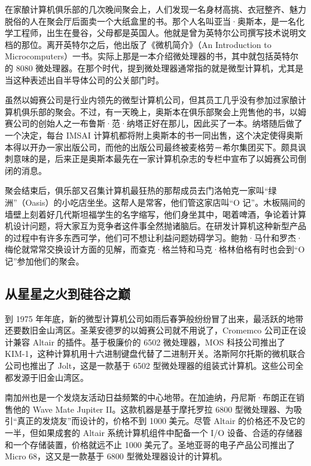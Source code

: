 \documentclass[12pt,UTF8]{ctexbook}
\begin{document}
在家酿计算机俱乐部的几次晚间聚会上，人们发现一名身材高挑、衣冠整齐、魅力脱俗的人在聚会厅后面卖一个大纸盒里的书。那个人名叫亚当·奥斯本，是一名化学工程师，出生在曼谷，父母都是英国人。他就是曾为英特尔公司撰写技术说明文档的那位。离开英特尔之后，他出版了《微机简介》（An Introduction to Microcomputers）一书。实际上那是一本介绍微处理器的书，其中就包括英特尔的 8080 微处理器。在那个时代，提到微处理器通常指的就是微型计算机，尤其是当这种表述出自半导体公司的公关部门时。

虽然以姆赛公司是行业内领先的微型计算机公司，但其员工几乎没有参加过家酿计算机俱乐部的聚会。不过，有一天晚上，奥斯本在俱乐部聚会上兜售他的书，以姆赛公司的创始人之一布鲁斯·范·纳塔正好在那儿，因此买了一本。纳塔随后做了一个决定，每台 IMSAI 计算机都将附上奥斯本的书一同出售，这个决定使得奥斯本得以开办一家出版公司，而他的出版公司最终被麦格劳－希尔集团买下。颇具讽刺意味的是，后来正是奥斯本最先在一家计算机杂志的专栏中宣布了以姆赛公司倒闭的消息。

聚会结束后，俱乐部又召集计算机最狂热的那帮成员去门洛帕克一家叫“绿洲”（Oasis）的小吃店坐坐。这帮人是常客，他们管这家店叫“O 记”。木板隔间的墙壁上刻着好几代斯坦福学生的名字缩写，他们身坐其中，喝着啤酒，争论着计算机设计问题，将大家互为竞争者这件事全然抛诸脑后。在研发计算机这种新型产品的过程中有许多东西可学，他们可不想让利益问题妨碍学习。鲍勃·马什和罗杰·梅伦就常常交换设计方面的见解，而查克·格兰特和马克·格林伯格有时也会到“O 记”参加他们的聚会。





\subsection{从星星之火到硅谷之巅}


到 1975 年年底，新的微型计算机公司如雨后春笋般纷纷冒了出来，最活跃的地带还要数旧金山湾区。圣莱安德罗的以姆赛公司就不用说了，Cromemco 公司正在设计兼容 Altair 的插件。基于极廉价的 6502 微处理器，MOS 科技公司推出了 KIM-1，这种计算机用十六进制键盘代替了二进制开关。洛斯阿尔托斯的微机联合公司也推出了 Jolt，这是一款基于 6502 型微处理器的组装式计算机。这些公司全都发源于旧金山湾区。

南加州也是一个发烧友活动日益频繁的中心地带。在加迪纳，丹尼斯·布朗正在销售他的 Wave Mate Jupiter II。这款机器是基于摩托罗拉 6800 型微处理器、为吸引“真正的发烧友”而设计的，价格不到 1000 美元。尽管 Altair 的价格还不及它的一半，但如果成套的 Altair 系统计算机组件中配备一个 I/O 设备、合适的存储器和一个存储装置，价格就远不止 1000 美元了。圣地亚哥的电子产品公司推出了 Micro 68，这又是一款基于 6800 型微处理器设计的计算机。
\end{document}
